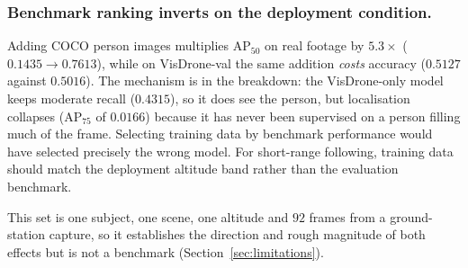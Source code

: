 \subsubsection{Benchmark ranking inverts on the deployment condition.}
Adding COCO person images multiplies AP$_{50}$ on real footage by $5.3\times$
($0.1435 \rightarrow 0.7613$), while on VisDrone-val the same addition \emph{costs}
accuracy ($0.5127$ against $0.5016$). The mechanism is in the breakdown: the VisDrone-only model
keeps moderate recall ($0.4315$), so it does see the person, but localisation
collapses (AP$_{75}$ of $0.0166$) because it has never been supervised on a person
filling much of the frame. Selecting training data by benchmark performance would
have selected precisely the wrong model. For short-range following, training data
should match the deployment altitude band rather than the evaluation benchmark.

This set is one subject, one scene, one altitude and $92$ frames from a ground-station
capture, so it establishes the direction and rough magnitude of both effects but is not
a benchmark (Section~\ref{sec:limitations}).
